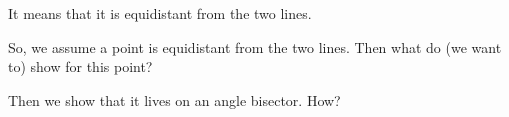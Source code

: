 



It means that it is equidistant from the two lines.

So, we assume a point is equidistant from the two lines. Then what do (we want to) show for this point?










Then we show that it lives on an angle bisector. How?




